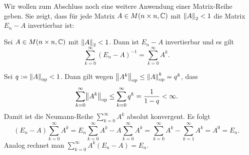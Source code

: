 Wir wollen zum Abschluss noch eine weitere Anwendung einer Matrix-Reihe geben.
Sie zeigt, dass für jede Matrix $A \in M(n \times n,\mathbb{C})$ mit $\left\lVert A\right\rVert_2 < 1$ die Matrix $E_n-A$ invertierbar ist:
\newpage
\begin{satz}
	\label{satz:10.18}
	Sei $A \in M(n \times n,\mathbb{C})$ mit $\left\lVert A\right\rVert_2 < 1$.
	Dann ist $E_n - A$ invertierbar und es gilt 
	\[
	\sum_{k=0}^{\infty} (E_n-A)^{-1} = \sum_{k=0}^{\infty} A^k.
	\]
\end{satz}

\begin{beweis}
	Sei $q := \left\lVert A\right\rVert_{\text{op}} < 1$.
	Dann gilt wegen $\left\lVert A^k\right\rVert_{\text{op}} \leq \left\lVert A\right\rVert_{\text{op}}^k = q^k$, dass
	\[
	\sum_{k=0}^{\infty} \opn{A^k} \leq \sum_{k=0}^{\infty} q^k = \frac{1}{1-q} < \infty.
	\]
	Damit ist die Neumann-Reihe $\sum_{k=0}^{\infty} A^k$ absolut konvergent.
	Es folgt
	\[
	(E_n-A) \sum_{k=0}^{\infty} A^k = E_n \sum_{k=0}^{\infty} A^k - A \sum_{k=0}^{\infty} A^k = \sum_{k=0}^{\infty} A^k - \sum_{k=1}^{\infty} A^k = A^0 = E_n.
	\]
	Analog rechnet man $\sum_{k=0}^{\infty} A^k(E_n - A) = E_n$. \qedhere
\end{beweis}
\newpage